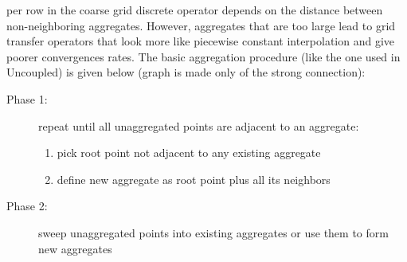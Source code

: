 per row in the coarse grid discrete operator depends on the distance between
non-neighboring aggregates. However, aggregates that are too large lead to
grid transfer operators that look more like piecewise constant interpolation
and give poorer convergences rates. The basic aggregation procedure (like the
one used in Uncoupled) is given below (graph is made only of the strong
connection):
\begin{description}
\item [Phase 1:] repeat until all unaggregated points are adjacent to an
aggregate:
\begin{enumerate}
\item pick root point not adjacent to any existing aggregate
\item define new aggregate as root point plus all its neighbors
\end{enumerate}
\item [Phase 2:] sweep unaggregated points into existing aggregates or use
them to form new aggregates
\end{description} 


